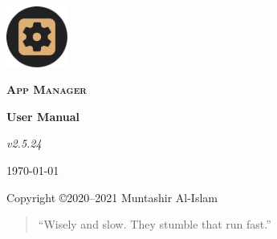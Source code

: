 \begin{titlingpage}
    \pagecolor{SunTan}
    \begin{center}
        \includegraphics[width=2cm]{./images/icon}\par\vspace{1cm}
        {\Huge\textbf{\textsc{App Manager}}\par}
        \vspace{2.5cm}
        {\huge\bfseries User Manual\par}
        \vspace{.5cm}
        {\Large\itshape v2.5.24\par}
        \vfill
        {\large \today\par}
        \vfill
        {Copyright \copyright 2020--2021 Muntashir Al-Islam\par}
        \pagebreak
        \pagecolor{white}
        \begin{quotation}
            ``Wisely and slow. They stumble that run fast.''
        \end{quotation}
    \end{center}
\end{titlingpage}
